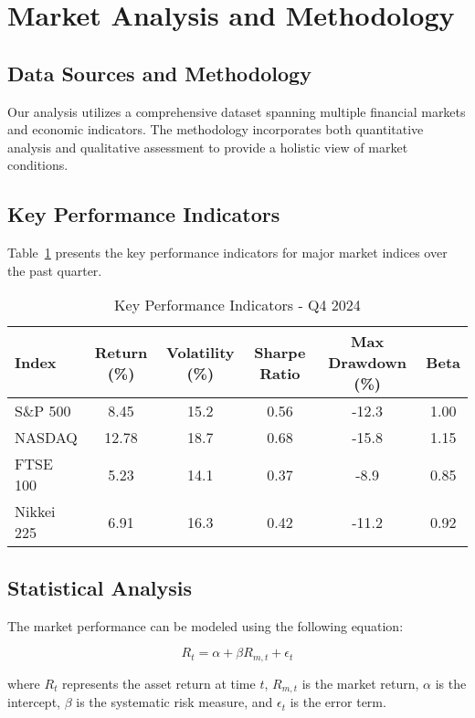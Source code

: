 \section{Market Analysis and Methodology}

\subsection{Data Sources and Methodology}
Our analysis utilizes a comprehensive dataset spanning multiple financial markets and economic indicators. 
The methodology incorporates both quantitative analysis and qualitative assessment to provide a 
holistic view of market conditions.~\cite{markowitz1952}

\subsection{Key Performance Indicators}
Table~\ref{tab:kpi} presents the key performance indicators for major market indices over the 
past quarter.

\begin{table}[htbp]
\centering
\caption{Key Performance Indicators - Q4 2024}
\label{tab:kpi}
\begin{tabular}{lccccc}
\toprule
\textbf{Index} & \textbf{Return (\%)} & \textbf{Volatility (\%)} & \textbf{Sharpe Ratio} & \textbf{Max Drawdown (\%)} & \textbf{Beta} \\
\midrule
S\&P 500 & 8.45 & 15.2 & 0.56 & -12.3 & 1.00 \\
NASDAQ & 12.78 & 18.7 & 0.68 & -15.8 & 1.15 \\
FTSE 100 & 5.23 & 14.1 & 0.37 & -8.9 & 0.85 \\
Nikkei 225 & 6.91 & 16.3 & 0.42 & -11.2 & 0.92 \\
\bottomrule
\end{tabular}
\end{table}

\subsection{Statistical Analysis}
The market performance can be modeled using the following equation:

\begin{equation}
R_t = \alpha + \beta R_{m,t} + \epsilon_t
\label{eq:capm}
\end{equation}

where $R_t$ represents the asset return at time $t$, $R_{m,t}$ is the market return, 
$\alpha$ is the intercept, $\beta$ is the systematic risk measure, and $\epsilon_t$ 
is the error term.

